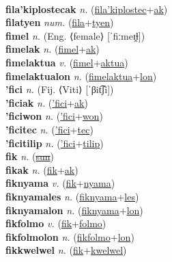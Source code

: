  \label{fila'kiplostecwon} \\
\textbf{fila'kiplostecak} \textit{n.} (\hyperref[fila'kiplostec]{fila'kiplostec}+\hyperref[ak]{ak})
 \label{fila'kiplostecak} \\
\textbf{filatyen} \textit{num.} (\hyperref[fila]{fila}+\hyperref[tyen]{tyen})
 \label{filatyen} \\
\textbf{fimel} \textit{n.} (Eng. ⟨female⟩ [ˈfiːmeɪ̯ɫ])
 \label{fimel} \\
\textbf{fimelak} \textit{n.} (\hyperref[fimel]{fimel}+\hyperref[ak]{ak})
 \label{fimelak} \\
\textbf{fimelaktua} \textit{v.} (\hyperref[fimel]{fimel}+\hyperref[aktua]{aktua})
 \label{fimelaktua} \\
\textbf{fimelaktualon} \textit{n.} (\hyperref[fimelaktua]{fimelaktua}+\hyperref[lon]{lon})
 \label{fimelaktualon} \\
\textbf{'fici} \textit{n.} (Fij. ⟨Viti⟩ [ˈβit͡ʃi])
 \label{'fici} \\
\textbf{'ficiak} \textit{n.} (\hyperref['fici]{'fici}+\hyperref[ak]{ak})
 \label{'ficiak} \\
\textbf{'ficiwon} \textit{n.} (\hyperref['fici]{'fici}+\hyperref[won]{won})
 \label{'ficiwon} \\
\textbf{'ficitec} \textit{n.} (\hyperref['fici]{'fici}+\hyperref[tec]{tec})
 \label{'ficitec} \\
\textbf{'ficitilip} \textit{n.} (\hyperref['fici]{'fici}+\hyperref[tilip]{tilip})
 \label{'ficitilip} \\
\textbf{fik} \textit{n.} (\hyperref[sun]{\sout{sun}})
 \label{fik} \\
\textbf{fikak} \textit{n.} (\hyperref[fik]{fik}+\hyperref[ak]{ak})
 \label{fikak} \\
\textbf{fiknyama} \textit{v.} (\hyperref[fik]{fik}+\hyperref[nyama]{nyama})
 \label{fiknyama} \\
\textbf{fiknyamales} \textit{n.} (\hyperref[fiknyama]{fiknyama}+\hyperref[les]{les})
 \label{fiknyamales} \\
\textbf{fiknyamalon} \textit{n.} (\hyperref[fiknyama]{fiknyama}+\hyperref[lon]{lon})
 \label{fiknyamalon} \\
\textbf{fikfolmo} \textit{v.} (\hyperref[fik]{fik}+\hyperref[folmo]{folmo})
 \label{fikfolmo} \\
\textbf{fikfolmolon} \textit{n.} (\hyperref[fikfolmo]{fikfolmo}+\hyperref[lon]{lon})
 \label{fikfolmolon} \\
\textbf{fikkwelwel} \textit{n.} (\hyperref[fik]{fik}+\hyperref[kwelwel]{kwelwel})
